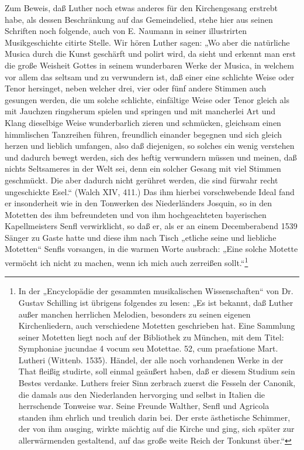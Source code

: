 Zum Beweis, daß Luther noch etwas anderes für den Kirchengesang erstrebt habe, als dessen Beschränkung auf das Gemeindelied, stehe hier aus seinen Schriften noch folgende, auch von E. Naumann in seiner illustrirten Musikgeschichte citirte Stelle. Wir hören Luther sagen: „Wo aber die natürliche Musica durch die Kunst geschärft und polirt wird, da sieht und erkennt man erst die große Weisheit Gottes in seinem wunderbaren Werke der Musica, in welchem vor allem das seltsam und zu verwundern ist, daß einer eine schlichte Weise oder Tenor hersinget, neben welcher drei, vier oder fünf andere Stimmen
auch gesungen werden, die um solche schlichte, einfältige Weise oder Tenor gleich als mit Jauchzen ringsherum spielen und springen und mit mancherlei Art und Klang dieselbige Weise wunderbarlich zieren und schmücken, gleichsam einen himmlischen Tanzreihen führen, freundlich einander begegnen und sich gleich herzen und lieblich umfangen, also daß diejenigen, so solches ein wenig verstehen und dadurch bewegt werden, sich des heftig verwundern müssen und meinen, daß nichts Seltsameres in der Welt sei, denn ein solcher Gesang mit viel Stimmen geschmückt. Die aber dadurch nicht gerühret werden, die sind fürwahr recht ungeschickte Esel.“ (Walch XIV, 411.) Das ihm hierbei vorschwebende Ideal fand er insonderheit wie in den Tonwerken des Niederländers Josquin, so in den Motetten des ihm befreundeten und von ihm hochgeachteten bayerischen Kapellmeisters Senfl verwirklicht, so daß er, als er an einem Decemberabend 1539 Sänger zu Gaste hatte und diese ihm nach Tisch „etliche seine und liebliche Motetten“ Senfls vorsangen, in die warmen Worte ausbrach: „Eine solche Motette vermöcht ich nicht zu machen, wenn ich mich auch zerreißen sollt.“\footnote{In der „Encyclopädie der gesammten musikalischen Wissenschaften“ von Dr. Gustav Schilling ist übrigens folgendes zu lesen: „Es ist bekannt, daß Luther außer manchen herrlichen Melodien, besonders zu seinen eigenen Kirchenliedern, auch verschiedene Motetten geschrieben hat. Eine Sammlung seiner Motetten liegt noch auf der Bibliothek zu München, mit dem Titel: Symphoniae jucundae 4 vocum seu Motettae. 52, cum praefatione Mart. Lutheri (Wittenb. 1535). Händel, der alle noch vorhandenen Werke in der That fleißig studirte, soll einmal geäußert haben, daß er diesem Studium sein Bestes verdanke. Luthers freier Sinn zerbrach zuerst die Fesseln der Canonik, die damals aus den Niederlanden hervorging und selbst in Italien die herrschende Tonweise war. Seine Freunde Walther, Senfl und Agricola standen ihm ehrlich und treulich darin bei. Der erste ästhetische Schimmer, der von ihm ausging, wirkte mächtig auf die Kirche und ging, sich später zur allerwärmenden gestaltend, auf das große weite Reich der Tonkunst über.“}


